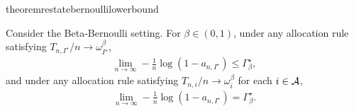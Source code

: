 \begin{restatable}{theorem}{restatebernoullilowerbound}
\begin{leftbar}[theorembar]\label{thm:bernoulli_lower_bound}
	Consider the Beta-Bernoulli setting. For $\beta \in (0,1)$, under any allocation rule satisfying 
	$T_{n, I^\star} / n \rightarrow \omega_{I^\star}^\beta$,
	\begin{align*}
	\lim_{n \rightarrow \infty} - \frac{1}{n} \log(1 - a_{n,I^\star}) \leq \Gamma_{\beta}^\star,
	\end{align*}
	and under any allocation rule satisfying $T_{n, i} / n \rightarrow \omega_i^\beta$ for each $i \in \mathcal{A}$,
	\begin{align*}
		\lim_{n \rightarrow \infty} - \frac{1}{n} \log(1 - a_{n,I^\star}) = \Gamma_{\beta}^\star.
	\end{align*}
\end{leftbar}
\end{restatable}

